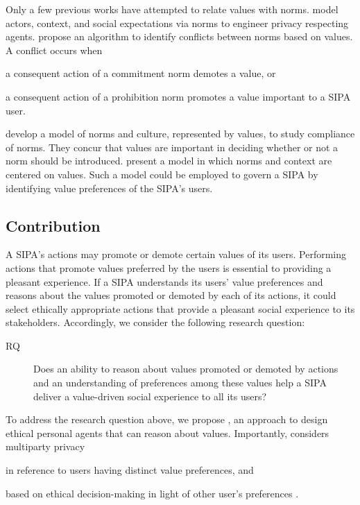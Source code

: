 Only a few previous works have attempted to relate values with norms.
\citet{Murukannaiah-IC16-Engineering} model actors, context, and social expectations via norms to engineer privacy respecting agents. 
\citet{DaSilvaFigueiredo-COIN13} propose an algorithm to identify conflicts between norms based on values. 
A conflict occurs when
\begin{enuminline}[label=(\arabic*)]
\item a consequent action of a commitment norm demotes a value, or
\item a consequent action of a prohibition norm promotes a value important to a SIPA user.
\end{enuminline}
%
\citet{Dechesne-AIL13-Norms+Values} develop a model of norms and culture,
represented by values, to study compliance of norms. They concur that
values are important in deciding whether or not a norm should be
introduced. \citet{kayal13coin} present a model in which norms and 
context are centered on values. Such a model could be employed
to govern a SIPA by identifying value preferences of the SIPA's
users.

\subsection{Contribution}
A SIPA's actions may promote or demote certain values of its users. 
Performing actions that promote values preferred by the users is essential to providing a pleasant experience. 
%
If a SIPA understands its users' value preferences
and reasons about the values promoted or demoted by each of its actions, it 
could select ethically appropriate actions that provide a pleasant social experience to its stakeholders.
Accordingly, we consider the following research question: 

\begin{description}
\item[RQ] Does an ability to reason about values promoted or demoted by actions and an understanding of preferences among these values help a SIPA deliver a value-driven social experience to all its users? 
\end{description}

To address the research question above, we propose \frameworkAinur, an
approach to design ethical personal agents that can reason about values.
Importantly, \frameworkAinur considers multiparty privacy 
\begin{enuminline}
\item in reference to users having distinct value preferences, and 
\item based on ethical decision-making in light of other user's preferences \citep{TOCHI-17:Multiuser}.
\end{enuminline} 

